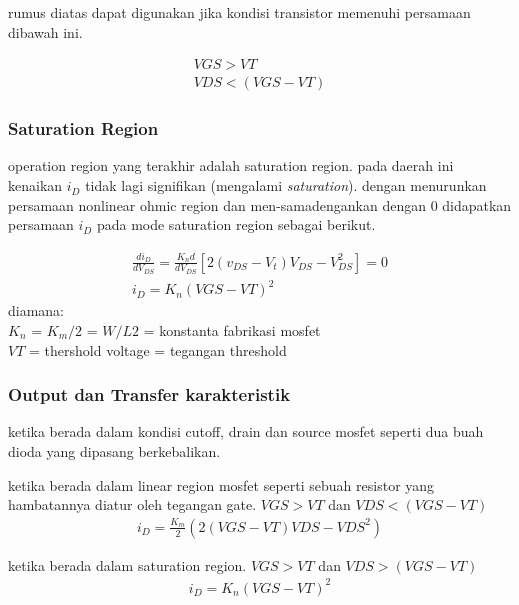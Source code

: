 rumus diatas dapat digunakan jika kondisi transistor memenuhi persamaan dibawah ini.

\begin{gather}
  VGS > VT \\
  VDS < (VGS-VT)
\end{gather}

\subsubsection{Saturation Region}
operation region yang terakhir adalah saturation region. pada daerah ini kenaikan $i_D$ tidak lagi signifikan
(mengalami \textit{saturation}). dengan menurunkan persamaan nonlinear ohmic region dan men-samadengankan dengan 0
didapatkan persamaan $i_D$ pada mode saturation region sebagai berikut. 

\begin{gather}
  \frac{di_D}{dV_{DS}} = \frac{K_n d}{dV_{DS}}[2 (v_{DS} - V_t) V_{DS} - V_{DS}^2] = 0 \\
  i_D = K_n (VGS - VT)^2
\end{gather}
diamana:\\
$K_n$ = $K_m/2$ = $W/L2$ = konstanta fabrikasi mosfet \\
$VT$ = thershold voltage = tegangan threshold \\ 


\subsubsection{Output dan Transfer karakteristik}
ketika berada dalam kondisi cutoff, drain dan source mosfet seperti dua buah dioda yang dipasang berkebalikan.


ketika berada dalam linear region mosfet seperti sebuah resistor yang hambatannya diatur oleh tegangan gate.
$VGS > VT$ dan $VDS < (VGS-VT)$
\begin{gather} 
  i_D = \frac{K_m}{2} (2(VGS-VT)VDS - VDS^2)
\end{gather}

ketika berada dalam saturation region. $VGS > VT$ dan $VDS > (VGS-VT)$
\begin{gather}
  i_D = K_n (VGS-VT)^2
\end{gather}



